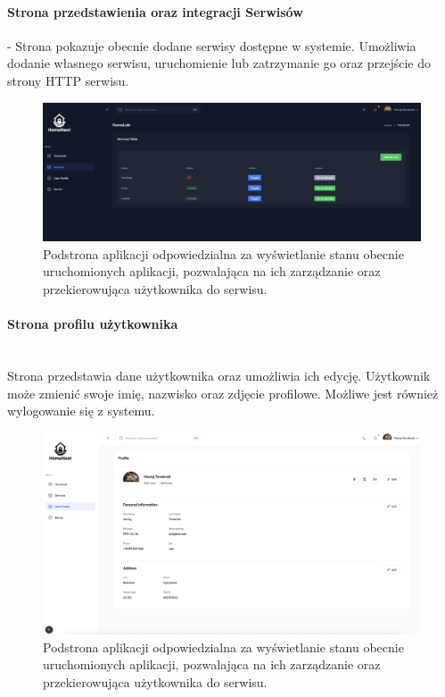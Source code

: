 \paragraph{Strona przedstawienia oraz integracji Serwisów} - Strona pokazuje obecnie dodane serwisy dostępne w systemie. Umożliwia dodanie własnego serwisu, uruchomienie lub zatrzymanie go oraz przejście do strony HTTP serwisu.
\begin{figure}[H]
  \centering
  \includegraphics[width=1\textwidth]{./chapters/assets/services_page.png}
  \caption{Podstrona aplikacji odpowiedzialna za wyświetlanie stanu obecnie uruchomionych aplikacji, pozwalająca na ich zarządzanie oraz przekierowująca użytkownika do serwisu.}
  \label{fig:ui_servicespage}
\end{figure}

\paragraph{Strona profilu użytkownika}\mbox{}\\
Strona przedstawia dane użytkownika oraz umożliwia ich edycję. Użytkownik może zmienić swoje imię, nazwisko oraz zdjęcie profilowe. Możliwe jest również wylogowanie się z systemu.

\begin{figure}[H]
  \centering
  \includegraphics[width=1\textwidth]{./chapters/assets/profile_page.png}
  \caption{Podstrona aplikacji odpowiedzialna za wyświetlanie stanu obecnie uruchomionych aplikacji, pozwalająca na ich zarządzanie oraz przekierowująca użytkownika do serwisu.}
  \label{fig:ui_profile_page}
\end{figure}

